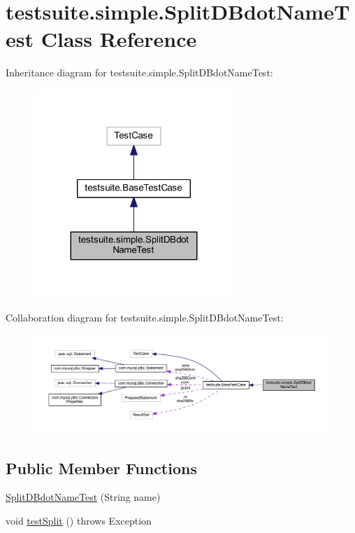 \hypertarget{classtestsuite_1_1simple_1_1_split_d_bdot_name_test}{}\section{testsuite.\+simple.\+Split\+D\+Bdot\+Name\+Test Class Reference}
\label{classtestsuite_1_1simple_1_1_split_d_bdot_name_test}


Inheritance diagram for testsuite.\+simple.\+Split\+D\+Bdot\+Name\+Test\+:
\nopagebreak
\begin{figure}[H]
\begin{center}
\leavevmode
\includegraphics[width=215pt]{classtestsuite_1_1simple_1_1_split_d_bdot_name_test__inherit__graph}
\end{center}
\end{figure}


Collaboration diagram for testsuite.\+simple.\+Split\+D\+Bdot\+Name\+Test\+:
\nopagebreak
\begin{figure}[H]
\begin{center}
\leavevmode
\includegraphics[width=350pt]{classtestsuite_1_1simple_1_1_split_d_bdot_name_test__coll__graph}
\end{center}
\end{figure}
\subsection*{Public Member Functions}
\begin{DoxyCompactItemize}
\item 
\mbox{\hyperlink{classtestsuite_1_1simple_1_1_split_d_bdot_name_test_ac0705ebb305a60c8c7e932f358c79039}{Split\+D\+Bdot\+Name\+Test}} (String name)
\item 
void \mbox{\hyperlink{classtestsuite_1_1simple_1_1_split_d_bdot_name_test_a079789e05d1272485f650f92c91777fa}{test\+Split}} ()  throws Exception 
\end{DoxyCompactItemize}
